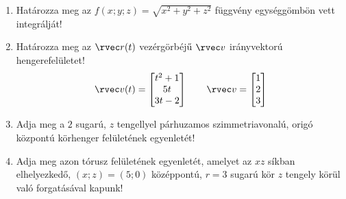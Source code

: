 \documentclass[a4paper, 12pt, fleqn]{scrartcl}
\begin{document}
\begin{enumerate}
\begin{minipage}{.275\textwidth}
\begin{center}
          \end{center}
        \end{minipage}

  \item Határozza meg az $f(x; y; z) = \sqrt{x^2 + y^2 + z^2}$ függvény
        egységgömbön vett integrálját!

  \item Határozza meg az $\rvec r(t)$ vezérgörbéjű $\rvec v$ irányvektorú
        hengerefelületet!
        $$
          \rvec v(t) = \begin{bmatrix}
            t^2 + 1 \\
            5t      \\
            3t-2
          \end{bmatrix}
          \qquad
          \rvec v = \begin{bmatrix}
            1 \\
            2 \\
            3
          \end{bmatrix}
        $$

  \item Adja meg a $2$ sugarú, $z$ tengellyel párhuzamos szimmetriavonalú,
        origó központú körhenger felületének egyenletét!

  \item Adja meg azon tórusz felületének egyenletét, amelyet az $xz$ síkban
        elhelyezkedő, $(x; z) = (5; 0)$ középpontú, $r = 3$ sugarú kör $z$
        tengely körül való forgatásával kapunk!
\end{enumerate}
\end{document}
